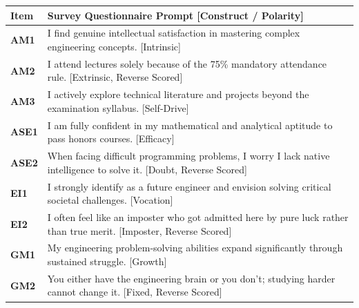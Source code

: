 \documentclass[aspectratio=169, 10pt]{beamer}
\begin{document}
\begin{frame}
  \begin{columns}[T]
    \begin{column}{0.495\textwidth}
      \begin{tcolorbox}[colback=white, colframe=BlueDeep, arc=1.5mm, boxrule=0.8pt, top=0.3mm, bottom=0.3mm, left=0.8mm, right=0.8mm, title={\scriptsize\bfseries\color{white}Quadrant 1: Academic Mindset \& Identity}, colbacktitle=BlueDeep]
        \fontsize{4.5pt}{5.4pt}\selectfont
        \renewcommand{\arraystretch}{0.83}
        \begin{tabularx}{\linewidth}{@{}l X@{}}
          \toprule
          \textbf{Item} & \textbf{Survey Questionnaire Prompt [Construct / Polarity]} \\
          \midrule
          \rowcolor{BlueLight} \textbf{AM1} & I find genuine intellectual satisfaction in mastering complex engineering concepts. [Intrinsic] \\
          \rowcolor{BlueLight} \textbf{AM2} & I attend lectures solely because of the 75\% mandatory attendance rule. [Extrinsic, Reverse Scored] \\
          \rowcolor{BlueLight} \textbf{AM3} & I actively explore technical literature and projects beyond the examination syllabus. [Self-Drive] \\
          \midrule
          \rowcolor{CanvasBG} \textbf{ASE1} & I am fully confident in my mathematical and analytical aptitude to pass honors courses. [Efficacy] \\
          \rowcolor{CanvasBG} \textbf{ASE2} & When facing difficult programming problems, I worry I lack native intelligence to solve it. [Doubt, Reverse Scored] \\
          \midrule
          \rowcolor{BlueLight} \textbf{EI1} & I strongly identify as a future engineer and envision solving critical societal challenges. [Vocation] \\
          \rowcolor{BlueLight} \textbf{EI2} & I often feel like an imposter who got admitted here by pure luck rather than true merit. [Imposter, Reverse Scored] \\
          \midrule
          \rowcolor{CanvasBG} \textbf{GM1} & My engineering problem-solving abilities expand significantly through sustained struggle. [Growth] \\
          \rowcolor{CanvasBG} \textbf{GM2} & You either have the engineering brain or you don't; studying harder cannot change it. [Fixed, Reverse Scored] \\
          \bottomrule
        \end{tabularx}

\end{tcolorbox}
\end{column}
\end{columns}
\end{frame}
\end{document}

